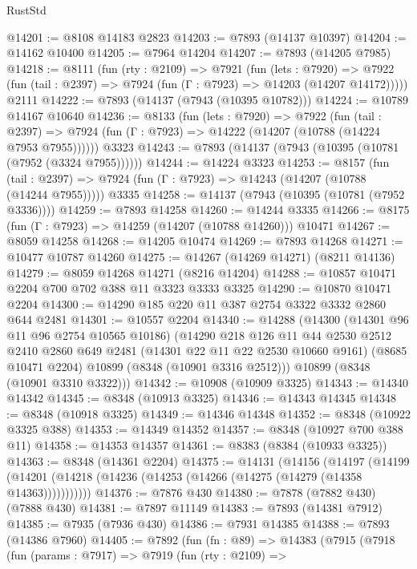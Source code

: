 \begin{lexlean}{RustStd}
\begin{coremodule}
{\begin{coremodule}
{{{{{{{{{{{{{{{{{{{{{{{{{{{{{{{{{{{{{{{{{{{{{{{{{{@14201 := @8108 @14183 @2823
@14203 := @7893 (@14137 @10397)
@14204 := @14162 @10400
@14205 := @7964 @14204
@14207 := @7893 (@14205 @7985)
@14218 := @8111
    (fun (rty : @2109) =>
    @7921
      (fun (lets : @7920) =>
      @7922 (fun (tail : @2397) => @7924 (fun (Γ : @7923) => @14203 (@14207 @14172)))))
    @2111
@14222 := @7893 (@14137 (@7943 (@10395 @10782)))
@14224 := @10789 @14167 @10640
@14236 := @8133
    (fun (lets : @7920) =>
    @7922
      (fun (tail : @2397) =>
      @7924 (fun (Γ : @7923) => @14222 (@14207 (@10788 (@14224 @7953 @7955))))))
    @3323
@14243 := @7893 (@14137 (@7943 (@10395 (@10781 (@7952 (@3324 @7955))))))
@14244 := @14224 @3323
@14253 := @8157
    (fun (tail : @2397) => @7924 (fun (Γ : @7923) => @14243 (@14207 (@10788 (@14244 @7955)))))
    @3335
@14258 := @14137 (@7943 (@10395 (@10781 (@7952 @3336))))
@14259 := @7893 @14258
@14260 := @14244 @3335
@14266 := @8175 (fun (Γ : @7923) => @14259 (@14207 (@10788 @14260))) @10471
@14267 := @8059 @14258
@14268 := @14205 @10474
@14269 := @7893 @14268
@14271 := @10477 @10787 @14260
@14275 := @14267 (@14269 @14271) (@8211 @14136)
@14279 := @8059 @14268 @14271 (@8216 @14204)
@14288 := @10857 @10471 @2204 @700 @702 @388 @11 @3323 @3333 @3325
@14290 := @10870 @10471 @2204
@14300 := @14290 @185 @220 @11 @387 @2754 @3322 @3332 @2860 @644 @2481
@14301 := @10557 @2204
@14340 := @14288
    (@14300
      (@14301 @96 @11 @96 @2754 @10565 @10186)
      (@14290
        @218
        @126
        @11
        @44
        @2530
        @2512
        @2410
        @2860
        @649
        @2481
        (@14301 @22 @11 @22 @2530 @10660 @9161)
        (@8685 @10471 @2204)
        @10899
        (@8348 (@10901 @3316 @2512)))
      @10899
      (@8348 (@10901 @3310 @3322)))
@14342 := @10908 (@10909 @3325)
@14343 := @14340 @14342
@14345 := @8348 (@10913 @3325)
@14346 := @14343 @14345
@14348 := @8348 (@10918 @3325)
@14349 := @14346 @14348
@14352 := @8348 (@10922 @3325 @388)
@14353 := @14349 @14352
@14357 := @8348 (@10927 @700 @388 @11)
@14358 := @14353 @14357
@14361 := @8383 (@8384 (@10933 @3325))
@14363 := @8348 (@14361 @2204)
@14375 := @14131
    (@14156
      (@14197
        (@14199 (@14201 (@14218 (@14236 (@14253 (@14266 (@14275 (@14279 (@14358 @14363)))))))))))
@14376 := @7876 @430
@14380 := @7878 (@7882 @430) (@7888 @430)
@14381 := @7897 @11149
@14383 := @7893 (@14381 @7912)
@14385 := @7935 (@7936 @430)
@14386 := @7931 @14385
@14388 := @7893 (@14386 @7960)
@14405 := @7892
    (fun (fn : @89) =>
    @14383
      (@7915
        (@7918
          (fun (params : @7917) =>
          @7919
            (fun (rty : @2109) =>
}}}}}}}}}}}}}}}}}}}}}}}}}}}}}}}}}}}}}}}}}}}}}}}}}}
\end{coremodule}}
\end{coremodule}
\end{lexlean}
